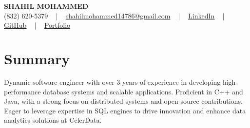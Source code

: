 \documentclass[letterpaper,10pt]{article}
\begin{document}
\begin{center}
    {\fontsize{14pt}{12pt}\selectfont \textbf{\MakeUppercase{Shahil Mohammed}}}\\ \vspace{2pt}
    \fontsize{10pt}{12pt}\selectfont (832) 620-5379 ~ | ~ \href{mailto:shahilmohammed14786@gmail.com}{shahilmohammed14786@gmail.com} ~ | ~  
    \href{https://www.linkedin.com/in/shahil-mohammed-9652931a1/}{\color{blue}\underline{LinkedIn}}  ~ | ~ 
    \href{https://github.com/freakbeast14}{\color{blue}\underline{GitHub}} ~ | ~ 
    \href{https://shahil-mohammed.netlify.app/}{\color{blue}\underline{Portfolio}}
    \vspace{-8pt}
\end{center}

\section{Summary}
\vspace{-2pt}\fontsize{8pt}{9pt}\selectfont
Dynamic software engineer with over 3 years of experience in developing high-performance database systems and scalable applications. Proficient in C++ and Java, with a strong focus on distributed systems and open-source contributions. Eager to leverage expertise in SQL engines to drive innovation and enhance data analytics solutions at CelerData.
 \vspace{-5pt}
 
\vspace{-2pt}
\end{document}
